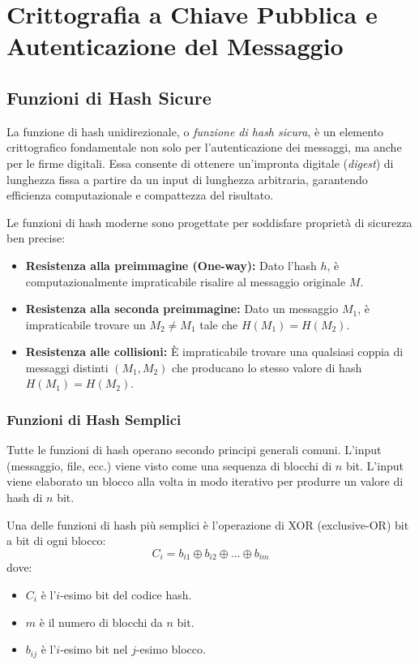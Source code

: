 \chapter{Crittografia a Chiave Pubblica e Autenticazione del Messaggio}

\section{Funzioni di Hash Sicure}

La funzione di hash unidirezionale, o \textit{funzione di hash sicura}, è un elemento crittografico fondamentale non solo per l'autenticazione dei messaggi, ma anche per le firme digitali. Essa consente di ottenere un'impronta digitale (\textit{digest}) di lunghezza fissa a partire da un input di lunghezza arbitraria, garantendo efficienza computazionale e compattezza del risultato. 

\begin{defbox}
Le funzioni di hash moderne sono progettate per soddisfare proprietà di sicurezza ben precise:
\begin{itemize}
    \item \textbf{Resistenza alla preimmagine (One-way):} Dato l'hash $h$, è computazionalmente impraticabile risalire al messaggio originale $M$.
    \item \textbf{Resistenza alla seconda preimmagine:} Dato un messaggio $M_1$, è impraticabile trovare un $M_2 \neq M_1$ tale che $H(M_1) = H(M_2)$.
    \item \textbf{Resistenza alle collisioni:} È impraticabile trovare una qualsiasi coppia di messaggi distinti $(M_1, M_2)$ che producano lo stesso valore di hash $H(M_1) = H(M_2)$.
\end{itemize}
\end{defbox}

\subsection{Funzioni di Hash Semplici}
Tutte le funzioni di hash operano secondo principi generali comuni. L'input (messaggio, file, ecc.) viene visto come una sequenza di blocchi di $n$ bit. L'input viene elaborato un blocco alla volta in modo iterativo per produrre un valore di hash di $n$ bit.

Una delle funzioni di hash più semplici è l'operazione di XOR (exclusive-OR) bit a bit di ogni blocco:
$$C_i = b_{i1} \oplus b_{i2} \oplus \dots \oplus b_{im}$$
dove:
\begin{itemize}
    \item $C_i$ è l'$i$-esimo bit del codice hash.
    \item $m$ è il numero di blocchi da $n$ bit.
    \item $b_{ij}$ è l'$i$-esimo bit nel $j$-esimo blocco.
\end{itemize}

